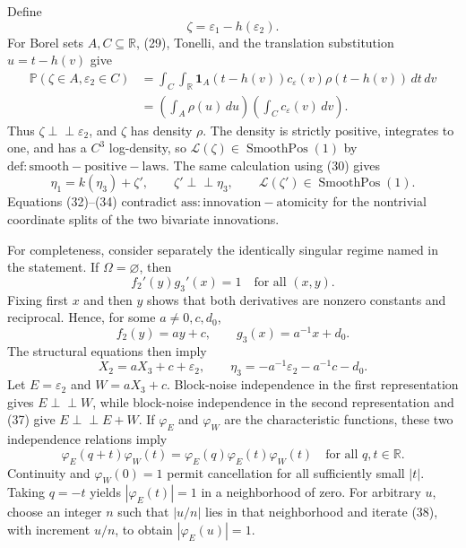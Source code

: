 Define
\[
 \zeta=\varepsilon_1-h(\varepsilon_2).
\tag{32}
\]
For Borel sets \(A,C\subseteq\mathbb R\), (29), Tonelli, and the translation substitution \(u=t-h(v)\) give
\[
 \begin{aligned}
 \mathbb P(\zeta\in A,\varepsilon_2\in C)
 &=\int_C\int_{\mathbb R}{\mathbf 1}_A(t-h(v))
 c_\varepsilon(v)\rho(t-h(v))\,dt\,dv\\
 &=\left(\int_A\rho(u)\,du\right)
   \left(\int_Cc_\varepsilon(v)\,dv\right).
 \end{aligned}
\tag{33}
\]
Thus \(\zeta\perp\!\!\!\perp\varepsilon_2\), and \(\zeta\) has density \(\rho\).  The density is strictly positive, integrates to one, and has a \(C^3\) log-density, so \(\mathcal L(\zeta)\in\operatorname{SmoothPos}(1)\) by \(\mathrm{def:smooth-positive-laws}\).  The same calculation using (30) gives
\[
 \eta_1=k(\eta_3)+\zeta',
 \qquad \zeta'\perp\!\!\!\perp\eta_3,
 \qquad \mathcal L(\zeta')\in\operatorname{SmoothPos}(1).
\tag{34}
\]
Equations (32)--(34) contradict \(\mathrm{ass:innovation-atomicity}\) for the nontrivial coordinate splits of the two bivariate innovations.

For completeness, consider separately the identically singular regime named in the statement.  If \(\Omega=\varnothing\), then
\[
 f_2'(y)g_3'(x)=1\quad\text{for all }(x,y).
\tag{35}
\]
Fixing first \(x\) and then \(y\) shows that both derivatives are nonzero constants and reciprocal.  Hence, for some \(a\ne0,c,d_0\),
\[
 f_2(y)=ay+c,
 \qquad g_3(x)=a^{-1}x+d_0.
\tag{36}
\]
The structural equations then imply
\[
 X_2=aX_3+c+\varepsilon_2,
 \qquad
 \eta_3=-a^{-1}\varepsilon_2-a^{-1}c-d_0.
\tag{37}
\]
Let \(E=\varepsilon_2\) and \(W=aX_3+c\).  Block-noise independence in the first representation gives \(E\perp\!\!\!\perp W\), while block-noise independence in the second representation and (37) give \(E\perp\!\!\!\perp E+W\).  If \(\varphi_E\) and \(\varphi_W\) are the characteristic functions, these two independence relations imply
\[
 \varphi_E(q+t)\varphi_W(t)
 =\varphi_E(q)\varphi_E(t)\varphi_W(t)
 \quad\text{for all }q,t\in\mathbb R.
\tag{38}
\]
Continuity and \(\varphi_W(0)=1\) permit cancellation for all sufficiently small \(|t|\).  Taking \(q=-t\) yields \(|\varphi_E(t)|=1\) in a neighborhood of zero.  For arbitrary \(u\), choose an integer \(n\) such that \(|u/n|\) lies in that neighborhood and iterate (38), with increment \(u/n\), to obtain \(|\varphi_E(u)|=1\).

